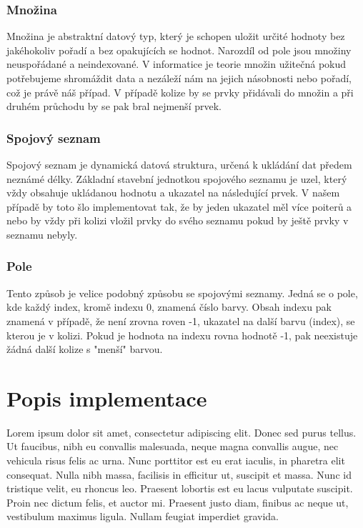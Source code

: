 \documentclass[12pt, a4paper]{article}
\begin{document}
\subsubsection{Množina}
Množina je abstraktní datový typ, který je schopen uložit určité hodnoty bez jakéhokoliv pořadí a bez opakujících se hodnot. Narozdíl od pole jsou množiny neuspořádané a neindexované. V informatice je teorie množin užitečná pokud potřebujeme shromáždit data a nezáleží nám na jejich násobnosti nebo pořadí, což je právě náš případ. V případě kolize by se prvky přidávali do množin a při druhém průchodu by se pak bral nejmenší prvek.

\subsubsection{Spojový seznam}
Spojový seznam je dynamická datová struktura, určená k ukládání dat předem neznámé délky. Základní stavební jednotkou spojového seznamu je uzel, který vždy obsahuje ukládanou hodnotu a ukazatel na následující prvek. V našem případě by toto šlo implementovat tak, že by jeden ukazatel měl více poiterů a nebo by vždy při kolizi vložil prvky do svého seznamu pokud by ještě prvky v seznamu nebyly.

\subsubsection{Pole}
Tento způsob je velice podobný způsobu se spojovými seznamy. Jedná se o pole, kde každý index, kromě indexu 0, znamená číslo barvy. Obsah indexu pak znamená v případě, že není zrovna roven -1, ukazatel na další barvu (index), se kterou je v kolizi. Pokud je hodnota na indexu rovna hodnotě -1, pak neexistuje žádná další kolize s "menší" barvou.  

\section{Popis implementace}

Lorem ipsum dolor sit amet, consectetur adipiscing elit. Donec sed purus tellus. Ut faucibus, nibh eu convallis malesuada, neque magna convallis augue, nec vehicula risus felis ac urna. Nunc porttitor est eu erat iaculis, in pharetra elit consequat. Nulla nibh massa, facilisis in efficitur ut, suscipit et massa. Nunc id tristique velit, eu rhoncus leo. Praesent lobortis est eu lacus vulputate suscipit. Proin nec dictum felis, et auctor mi. Praesent justo diam, finibus ac neque ut, vestibulum maximus ligula. Nullam feugiat imperdiet gravida.
\end{document}
